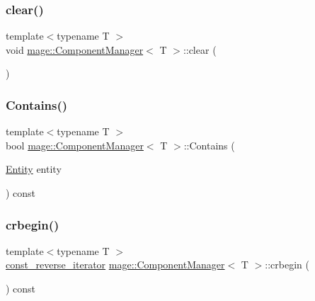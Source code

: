 \mbox{\label{classmage_1_1_component_manager_a3aeebdd5734ecea5cac0b26d4ccff75d}} 
\subsubsection{\texorpdfstring{clear()}{clear()}}
{\footnotesize\ttfamily template$<$typename T $>$ \\
void \mbox{\hyperlink{classmage_1_1_component_manager}{mage\+::\+Component\+Manager}}$<$ T $>$\+::clear (\begin{DoxyParamCaption}{ }\end{DoxyParamCaption})\hspace{0.3cm}{\ttfamily [noexcept]}}

\mbox{\label{classmage_1_1_component_manager_ab2e42b8c655b1279b8bd136536e1acfc}} 
\subsubsection{\texorpdfstring{Contains()}{Contains()}}
{\footnotesize\ttfamily template$<$typename T $>$ \\
bool \mbox{\hyperlink{classmage_1_1_component_manager}{mage\+::\+Component\+Manager}}$<$ T $>$\+::Contains (\begin{DoxyParamCaption}\item[{\mbox{\hyperlink{classmage_1_1_entity}{Entity}}}]{entity }\end{DoxyParamCaption}) const\hspace{0.3cm}{\ttfamily [noexcept]}}

\mbox{\label{classmage_1_1_component_manager_ade414af14d8e7af5236b5a93b1741ab7}} 
\subsubsection{\texorpdfstring{crbegin()}{crbegin()}}
{\footnotesize\ttfamily template$<$typename T $>$ \\
\mbox{\hyperlink{classmage_1_1_component_manager_a00481d8beab5d950124f54c0f832da53}{const\+\_\+reverse\+\_\+iterator}} \mbox{\hyperlink{classmage_1_1_component_manager}{mage\+::\+Component\+Manager}}$<$ T $>$\+::crbegin (\begin{DoxyParamCaption}{ }\end{DoxyParamCaption}) const\hspace{0.3cm}{\ttfamily [noexcept]}}

